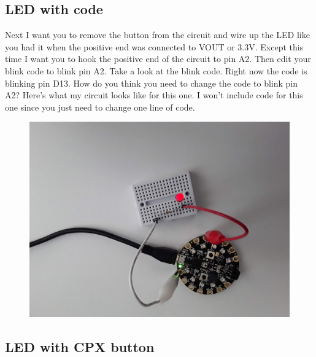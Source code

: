 \subsection{LED with code}

Next I want you to remove the button from the circuit and wire up the
LED like you had it when the positive end was connected to VOUT or
3.3V. Except this time I want you to hook the positive end of the
circuit to pin A2. Then edit your blink code to blink pin A2. Take
a look at the blink 
code. Right now the code is blinking pin D13. How do you think you
need to change the code to blink pin A2? Here’s what my circuit looks
like for this one. I won’t include code for this one since you just
need to change one line of code.
\begin{figure}[H]
  \begin{center}
    \includegraphics[width=\textwidth]{Figures/LED4.jpeg}
  \end{center}
\end{figure}

\subsection{LED with CPX button}

